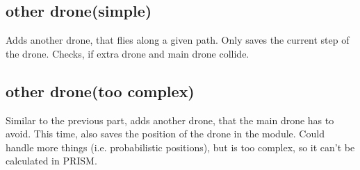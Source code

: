 \documentclass{article}
\begin{document}
\subsection{other drone(simple)}
Adds another drone, that flies along a given path. Only saves the current step of the drone. Checks, if extra drone and main drone collide.

\subsection{other drone(too complex)}
Similar to the previous part, adds another drone, that the main drone has to avoid. This time, also saves the position of the drone in the module. Could handle more things (i.e. probabilistic positions), but is too complex, so it can't be calculated in PRISM.
\end{document}
